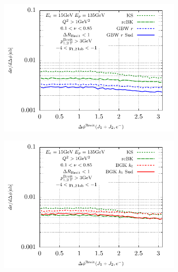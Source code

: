 \documentclass[11pt]{article}
\begin{document}
\begin{figure}[p]
\begin{subfigure}{0.5\textwidth}
	\end{subfigure}
	\begin{subfigure}{0.5\textwidth}
	\includegraphics[width=\textwidth]{plots/plotGBW3}
	\end{subfigure}
	\begin{subfigure}{0.5\textwidth}
	\includegraphics[width=\textwidth]{plots/plotBGK2}
	\end{subfigure}
	\begin{subfigure}{0.5\textwidth}

\end{subfigure}
\end{figure}
\end{document}
